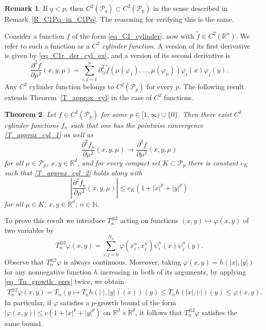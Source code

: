 \documentclass{article}
\newtheorem{theorem}{Theorem}[section]
\theoremstyle{definition}
\newtheorem{remark}[theorem]{\textbf{Remark}}
\numberwithin{equation}{section}
\numberwithin{theorem}{section}
\newcommand{\R}{\mathbb{R}}
\newcommand{\N}{{\mathbb N}}
\newcommand{\Pcal}{{\mathcal P}}
\begin{document}
\begin{remark}
If $q < p$, then $C^2(\Pcal_q) \subset C^2(\Pcal_p)$ in the sense described in Remark~\ref{R_C1Pq_in_C1Pp}. The reasoning for verifying this is the same.
\end{remark}



Consider a function $f$ of the form \eqref{eq_C1_cylinder}, now with $\tilde f\in C^2(\R^n)$. We refer to such a function as a \emph{$C^2$ cylinder function}. A version of its first derivative is given by \eqref{eq_C1r_der_cyl_ex}, and a version of its second derivative is
\begin{equation}\label{eq_C2r_2n_der_cyl_ex}
\frac{\partial^2 f}{\partial\mu^2}(x,y,\mu) = \sum_{i,j=1}^n \partial^2_{ij}\tilde f(\mu(\varphi_1),\ldots,\mu(\varphi_n)) \varphi_i(x)\varphi_j(y).
\end{equation}
Any $C^2$ cylinder function belongs to $C^2(\Pcal_p)$ for every $p$. The following result extends Theorem~\ref{T_approx_cyl} in the case of $C^2$ functions.










\begin{theorem}\label{T_approx_cyl_C2}
Let $f \in C^2(\Pcal_p)$ for some $p \in [1,\infty) \cup \{0\}$. Then there exist $C^2$ cylinder functions $f_n$ such that one has the pointwise convergence \eqref{T_approx_cyl_1} as well as
\begin{equation}\label{T_approx_cyl_1_C2}
\frac{\partial^2 f_n}{\partial\mu^2}(x,y,\mu) \to \frac{\partial^2 f}{\partial\mu^2}(x,y,\mu)
\end{equation}
for all $\mu \in \Pcal_p$, $x,y \in {\R^d}$, and for every compact set $K\subset\Pcal_p$ there is constant $c_K$ such that \eqref{T_approx_cyl_2} holds along with
\begin{equation}\label{T_approx_cyl_2_C2}
\left|  \frac{\partial^2 f_n}{\partial\mu^2}(x,y,\mu) \right| \le c_K (1 + |x|^p + |y|^p)
\end{equation}
for all $\mu\in K$, $x,y \in {\R^d}$, $n\in\N$.
\end{theorem}

To prove this result we introduce $T_n^{\otimes 2}$ acting on functions $(x,y)\mapsto\varphi(x,y)$ of two variables by
\[
T_n^{\otimes 2}\varphi(x,y) = \sum_{i,j=0}^{N_n} \varphi(x^n_i,x^n_j)\psi^n_i(x)\psi^n_j(y).
\]
Observe that $T_n^{\otimes 2}\varphi$ is always continuous. Moreover, taking $\varphi(x,y)=h(|x|,|y|)$ for any nonnegative function $h$ increasing in both of its arguments, by applying \eqref{eq_Tn_growth_pres} twice, we obtain
\begin{align*}
T_n^{\otimes 2}\varphi (x,y)
=T_n\left(y\mapsto T_n h(|\cdot|,|y|)(x)\right)(y)
\le T_n h(|x|,|\cdot|)(y)
\le \varphi(x,y).
\end{align*}
In particular, if $\varphi$ satisfies a $p$-growth bound of the form $|\varphi(x,y)|\le c(1+|x|^p+|y|^p)$ on $\R^d\times\R^d$, it follows that $T_n^{\otimes 2}\varphi$ satisfies the same bound.
\end{document}
